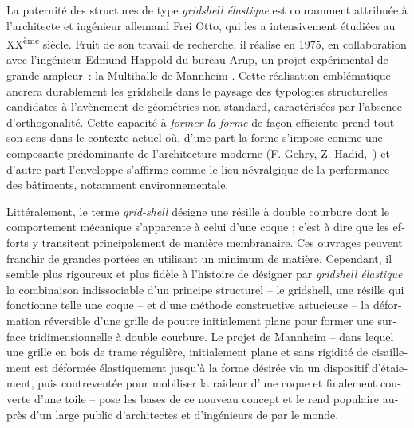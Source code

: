 \begin{otherlanguage}{french}


La paternité des structures de type \emph{gridshell élastique} est couramment attribuée à l'architecte et ingénieur allemand Frei Otto, qui les a intensivement étudiées au XX\textsuperscript{ème} siècle. Fruit de son travail de recherche, il réalise en 1975, en collaboration avec l'ingénieur Edmund Happold du bureau Arup, un projet expérimental de grande ampleur~: la Multihalle de Mannheim \cite{IL13,Happold1975}. Cette réalisation emblématique ancrera durablement les gridshells dans le paysage des typologies structurelles candidates à l'avènement de géométries non-standard, caractérisées par l'absence d'orthogonalité. Cette capacité à \emph{former la forme} de façon efficiente prend tout son sens dans le contexte actuel où, d'une part la forme s'impose comme une composante prédominante de l'architecture moderne (F. Gehry, Z. Hadid,~\telp{}) et d'autre part l'enveloppe s'affirme comme le lieu névralgique de la performance des bâtiments, notamment environnementale.

Littéralement, le terme \emph{grid-shell} désigne une résille à double courbure dont le comportement mécanique s'apparente à celui d'une coque ; c'est à dire que les efforts y transitent principalement de manière membranaire. Ces ouvrages peuvent franchir de grandes portées en utilisant un minimum de matière. Cependant, il semble plus rigoureux et plus fidèle à l'histoire de désigner par \emph{gridshell élastique} la combinaison indissociable d'un principe structurel -- le gridshell, une résille qui fonctionne telle une coque -- et d'une méthode constructive astucieuse -- la déformation réversible d'une grille de poutre initialement plane pour former une surface tridimensionnelle à double courbure. Le projet de Mannheim -- dans lequel une grille en bois de trame régulière, initialement plane et sans rigidité de cisaillement est déformée élastiquement jusqu'à la forme désirée via un dispositif d'étaiement, puis contreventée pour mobiliser la raideur d'une coque et finalement couverte d'une toile -- pose les bases de ce nouveau concept et le rend populaire auprès d'un large public d'architectes et d'ingénieurs de par le monde.


\end{otherlanguage}
